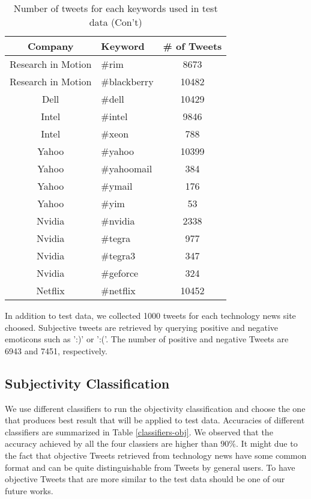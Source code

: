 \documentclass[12pt]{article}
\begin{document}
\begin{table}
\begin{center}
    \begin{tabular}{ | c || l | c | }
        \hline
        \textbf{Company} &  \textbf{Keyword} & \textbf{\# of Tweets} \\ \hline
        \hline
        Research in Motion &  \#rim & 8673 \\ \hline
        Research in Motion &  \#blackberry & 10482 \\ \hline
        Dell &  \#dell & 10429 \\ \hline
        Intel &  \#intel & 9846 \\ \hline
        Intel &  \#xeon & 788 \\ \hline
        Yahoo &  \#yahoo & 10399 \\ \hline
        Yahoo &  \#yahoomail & 384 \\ \hline
        Yahoo &  \#ymail & 176 \\ \hline
        Yahoo &  \#yim & 53 \\ \hline
        Nvidia &  \#nvidia & 2338 \\ \hline
        Nvidia &  \#tegra & 977 \\ \hline
        Nvidia &  \#tegra3 & 347 \\ \hline
        Nvidia &  \#geforce & 324 \\ \hline
        Netflix &  \#netflix & 10452 \\ \hline
        \hline
    \end{tabular}
\caption{Number of tweets for each keywords used in test data (Con't)}
\label{keywords-tweet-numbers-02}
\end{center}
\end{table}

In addition to test data, we collected 1000 tweets for each technology news site choosed. Subjective tweets are retrieved by querying positive and negative emoticons such as ':)' or ':('. The number of positive and negative Tweets are 6943 and 7451, respectively.

\subsection{Subjectivity Classification}
We use different classifiers to run the objectivity classification and choose the one that produces best result that will be applied to test data. Accuracies of different classifiers are summarized in Table \ref{classifiers-obj}. We observed that the accuracy achieved by all the four classiers are higher than $90\%$. It might due to the fact that objective Tweets retrieved from technology news have some common format and can be quite distinguishable from Tweets by general users. To have objective Tweets that are more similar to the test data should be one of our future works.
\end{document}
